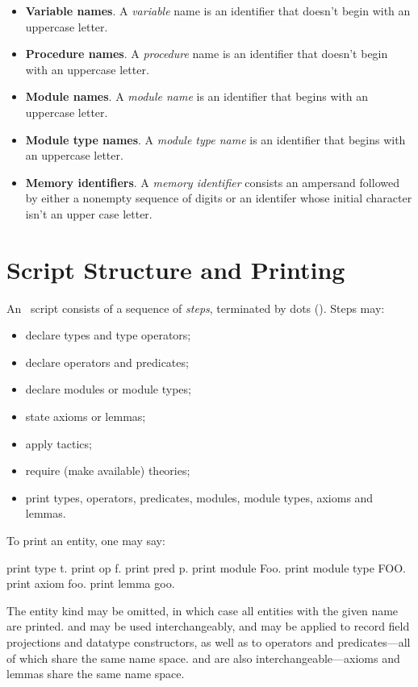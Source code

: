 \begin{itemize}
\item \textbf{Variable names}. A \emph{variable} name is an identifier
  that doesn't begin with an uppercase letter.

\item \textbf{Procedure names}. A \emph{procedure} name is an identifier
  that doesn't begin with an uppercase letter.

\item \textbf{Module names}. A \emph{module name} is an identifier that
  begins with an uppercase letter.

\item \textbf{Module type names}. A \emph{module type name} is an
  identifier that begins with an uppercase letter.

\item \textbf{Memory identifiers}. A \emph{memory identifier} consists
  an ampersand followed by either a nonempty sequence of digits or an
  identifer whose initial character isn't an upper case letter.
\end{itemize}

\section{Script Structure and Printing}

An \EasyCrypt\ script consists of a sequence of \emph{steps},
terminated by dots (). Steps may:
\begin{itemize}
\item declare types and type operators;

\item declare operators and predicates;

\item declare modules or module types;

\item state axioms or lemmas;

\item apply tactics;

\item require (make available) theories;

\item print types, operators, predicates, modules, module types,
  axioms and lemmas.
\end{itemize}

To print an entity, one may say:
\begin{easycrypt}{}{}
print type t.
print op f.
print pred p.
print module Foo.
print module type FOO.
print axiom foo.
print lemma goo.
\end{easycrypt}
The entity kind may be omitted, in which case all entities with the
given name are printed.  and  may be used
interchangeably, and may be applied to record field projections and
datatype constructors, as well as to operators and predicates---all of which
share the same name space.
 and  are also interchangeable---axioms
and lemmas share the same name space.

